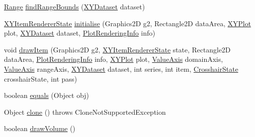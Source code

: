 \begin{DoxyCompactItemize}
\item 
\mbox{\hyperlink{classorg_1_1jfree_1_1data_1_1_range}{Range}} \mbox{\hyperlink{classorg_1_1jfree_1_1chart_1_1renderer_1_1xy_1_1_candlestick_renderer_a474f9a432d60cbdd154642ed9f13f659}{find\+Range\+Bounds}} (\mbox{\hyperlink{interfaceorg_1_1jfree_1_1data_1_1xy_1_1_x_y_dataset}{X\+Y\+Dataset}} dataset)
\item 
\mbox{\hyperlink{classorg_1_1jfree_1_1chart_1_1renderer_1_1xy_1_1_x_y_item_renderer_state}{X\+Y\+Item\+Renderer\+State}} \mbox{\hyperlink{classorg_1_1jfree_1_1chart_1_1renderer_1_1xy_1_1_candlestick_renderer_a118db6811e46c6dc47ad83d25cf6773c}{initialise}} (Graphics2D g2, Rectangle2D data\+Area, \mbox{\hyperlink{classorg_1_1jfree_1_1chart_1_1plot_1_1_x_y_plot}{X\+Y\+Plot}} plot, \mbox{\hyperlink{interfaceorg_1_1jfree_1_1data_1_1xy_1_1_x_y_dataset}{X\+Y\+Dataset}} dataset, \mbox{\hyperlink{classorg_1_1jfree_1_1chart_1_1plot_1_1_plot_rendering_info}{Plot\+Rendering\+Info}} info)
\item 
void \mbox{\hyperlink{classorg_1_1jfree_1_1chart_1_1renderer_1_1xy_1_1_candlestick_renderer_aa88e077433fecfa7ce85ae2269bc8cf8}{draw\+Item}} (Graphics2D g2, \mbox{\hyperlink{classorg_1_1jfree_1_1chart_1_1renderer_1_1xy_1_1_x_y_item_renderer_state}{X\+Y\+Item\+Renderer\+State}} state, Rectangle2D data\+Area, \mbox{\hyperlink{classorg_1_1jfree_1_1chart_1_1plot_1_1_plot_rendering_info}{Plot\+Rendering\+Info}} info, \mbox{\hyperlink{classorg_1_1jfree_1_1chart_1_1plot_1_1_x_y_plot}{X\+Y\+Plot}} plot, \mbox{\hyperlink{classorg_1_1jfree_1_1chart_1_1axis_1_1_value_axis}{Value\+Axis}} domain\+Axis, \mbox{\hyperlink{classorg_1_1jfree_1_1chart_1_1axis_1_1_value_axis}{Value\+Axis}} range\+Axis, \mbox{\hyperlink{interfaceorg_1_1jfree_1_1data_1_1xy_1_1_x_y_dataset}{X\+Y\+Dataset}} dataset, int series, int item, \mbox{\hyperlink{classorg_1_1jfree_1_1chart_1_1plot_1_1_crosshair_state}{Crosshair\+State}} crosshair\+State, int pass)
\item 
boolean \mbox{\hyperlink{classorg_1_1jfree_1_1chart_1_1renderer_1_1xy_1_1_candlestick_renderer_a485c75b3f10761630e5f1cec14097517}{equals}} (Object obj)
\item 
Object \mbox{\hyperlink{classorg_1_1jfree_1_1chart_1_1renderer_1_1xy_1_1_candlestick_renderer_abd4483431235a297dcfc3d1df3ce8946}{clone}} ()  throws Clone\+Not\+Supported\+Exception 
\item 
boolean \mbox{\hyperlink{classorg_1_1jfree_1_1chart_1_1renderer_1_1xy_1_1_candlestick_renderer_ac264183fd9a150229b407d4a48f1ce49}{draw\+Volume}} ()
\end{DoxyCompactItemize}
